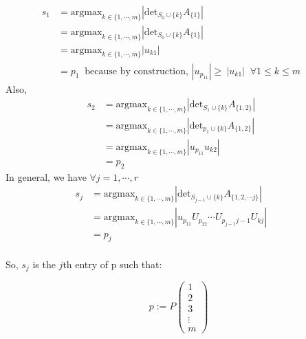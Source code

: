 \documentclass[11pt]{article}
\begin{document}
\begin{align*}
s_1  & = \text{argmax}_{k \in \{1, \cdots, m\}}\left|\text{det}_{S_{0}\cup\{k\}}A_{\{1\}}\right|   &&\\
       &  = \text{argmax}_{k \in \{1, \cdots, m\}}\left|\text{det}_{S_{0}\cup\{k\}}A_{\{1\}}\right|   &&\\
      &  =  \text{argmax}_{k \in \{1, \cdots, m\}}\left|{u_{k1}}\right|   && \\
      & = p_1 \;\; \text{because by construction, } \left|{u_{p_11}}\right| \geq \ \left|{u_{k1}}\right|   \;\; \forall  1\leq k\leq m  &&
\end{align*}
Also, 
\begin{align*}
s_2  & = \text{argmax}_{k \in \{1, \cdots, m\}}\left|\text{det}_{S_{1}\cup\{k\}}A_{\{1, 2\}}\right|   &&\\
       &  = \text{argmax}_{k \in \{1, \cdots, m\}}\left|\text{det}_{p_1\cup\{k\}}A_{\{1, 2\}}\right|   &&\\
      &  =  \text{argmax}_{k \in \{1, \cdots, m\}}\left|{u_{p_11}u_{k2}}\right|   && \\
      & = p_2 
\end{align*}
In general, we have $\forall  j = 1, \cdots, r$
\begin{align*}
s_j  & = \text{argmax}_{k \in \{1, \cdots, m\}}\left|\text{det}_{S_{j-1}\cup\{k\}}A_{\{1, 2, \cdots j\}}\right|   &&\\
      &  =  \text{argmax}_{k \in \{1, \cdots, m\}}\left|{u_{p_11}U_{p_22}\cdots U_{p_{j-1}{j-1}}U_{kj}}\right|   && \\
      & = p_j 
\end{align*}
\\
\noindent So, $s_j$ is the $j$th entry of p such that:

\begin{equation*}
p := P
\begin{pmatrix}
1\\
2\\
3\\
\vdots\\
m
\end{pmatrix}
\end{equation*}
\end{document}
